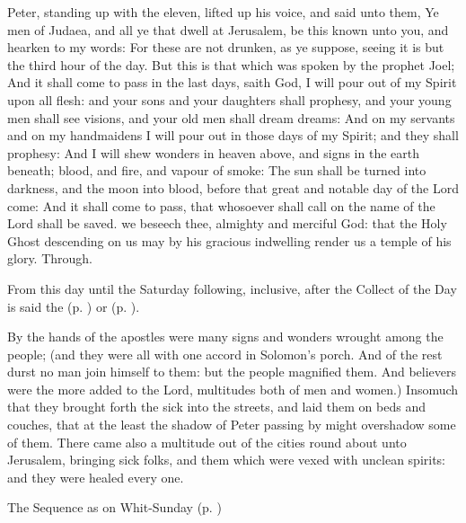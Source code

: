  Peter, standing up with the eleven, lifted up his voice, and said unto them, Ye men of Judaea, and all ye that dwell at Jerusalem, be this known unto you, and hearken to my words: For these are not drunken, as ye suppose, seeing it is but the third hour of the day. But this is that which was spoken by the prophet Joel; And it shall come to pass in the last days, saith God, I will pour out of my Spirit upon all flesh: and your sons and your daughters shall prophesy, and your young men shall see visions, and your old men shall dream dreams: And on my servants and on my handmaidens I will pour out in those days of my Spirit; and they shall prophesy: And I will shew wonders in heaven above, and signs in the earth beneath; blood, and fire, and vapour of smoke: The sun shall be turned into darkness, and the moon into blood, before that great and notable day of the Lord come: And it shall come to pass, that whosoever shall call on the name of the Lord shall be saved.
\collect
{} we beseech thee, almighty and merciful God: that the Holy Ghost descending on us may by his gracious indwelling render us a temple of his glory. Through.
\begin{rubric}
    From this day until the Saturday following, inclusive, after the Collect of the Day is said the   (p. \pageref{SPAgainst}) or  (p. \pageref{SPChiefBishop}).
\end{rubric}
 By the hands of the apostles were many signs and wonders wrought among the people; (and they were all with one accord in Solomon's porch. And of the rest durst no man join himself to them: but the people magnified them. And believers were the more added to the Lord, multitudes both of men and women.) Insomuch that they brought forth the sick into the streets, and laid them on beds and couches, that at the least the shadow of Peter passing by might overshadow some of them. There came also a multitude out of the cities round about unto Jerusalem, bringing sick folks, and them which were vexed with unclean spirits: and they were healed every one.
\begin{rubric}
{The Sequence as on Whit-Sunday (p. \pageref{WhitSeq})}
\end{rubric}
